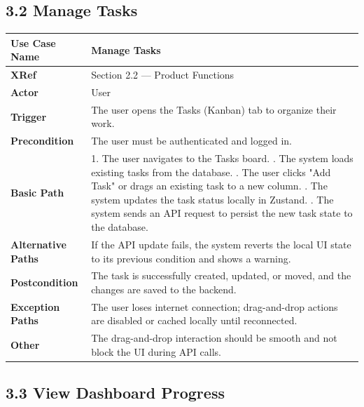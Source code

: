 \documentclass[12pt]{article}
\begin{document}
\subsection*{3.2 Manage Tasks}

\renewcommand{\arraystretch}{1.5}
\begin{xltabular}{\textwidth}{|p{4cm}|X|}
\hline
\textbf{Use Case Name} & \textbf{Manage Tasks} \\ \hline
\textbf{XRef} & Section 2.2 — Product Functions \\ \hline
\textbf{Actor} & User \\ \hline
\textbf{Trigger} & The user opens the Tasks (Kanban) tab to organize their work. \\ \hline
\textbf{Precondition} & The user must be authenticated and logged in. \\ \hline
\textbf{Basic Path} & 1. The user navigates to the Tasks board. . The system loads existing tasks from the database. . The user clicks "Add Task" or drags an existing task to a new column. . The system updates the task status locally in Zustand. . The system sends an API request to persist the new task state to the database. \\ \hline
\textbf{Alternative Paths} & If the API update fails, the system reverts the local UI state to its previous condition and shows a warning. \\ \hline
\textbf{Postcondition} & The task is successfully created, updated, or moved, and the changes are saved to the backend. \\ \hline
\textbf{Exception Paths} & The user loses internet connection; drag-and-drop actions are disabled or cached locally until reconnected. \\ \hline
\textbf{Other} & The drag-and-drop interaction should be smooth and not block the UI during API calls. \\ \hline
\end{xltabular}

\subsection*{3.3 View Dashboard Progress}
\end{document}
